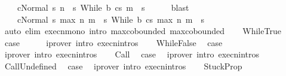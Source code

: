 \begin{isabellebody}
\ \ \ \ {\isachardoublequoteopen}{\isasymGamma}{\isasymturnstile}{\isasymlangle}c{\isacharcomma}Normal\ s{\isasymrangle}\ {\isacharequal}n{\isasymRightarrow}\ \ s{\isacharprime}{\isachardoublequoteclose}\ {\isachardoublequoteopen}{\isasymGamma}{\isasymturnstile}{\isasymlangle}While\ b\ c{\isacharcomma}s{\isacharprime}{\isasymrangle}\ {\isacharequal}m{\isasymRightarrow}\ \ s{\isacharprime}{\isacharprime}{\isachardoublequoteclose}\isanewline
\ \ \ \ \isamarkupfalse%
\ blast\isanewline
\ \ \isamarkupfalse%
\ \isamarkupfalse%
\ \isanewline
\ \ \ \ {\isachardoublequoteopen}{\isasymGamma}{\isasymturnstile}{\isasymlangle}c{\isacharcomma}Normal\ s{\isasymrangle}\ {\isacharequal}max\ n\ m{\isasymRightarrow}\ \ s{\isacharprime}{\isachardoublequoteclose}\ {\isachardoublequoteopen}{\isasymGamma}{\isasymturnstile}{\isasymlangle}While\ b\ c{\isacharcomma}s{\isacharprime}{\isasymrangle}\ {\isacharequal}max\ n\ m{\isasymRightarrow}\ \ s{\isacharprime}{\isacharprime}{\isachardoublequoteclose}\isanewline
\ \ \ \ \isamarkupfalse%
\ {\isacharparenleft}auto\ elim{\isacharbang}{\isacharcolon}\ execn{\isacharunderscore}mono\ intro{\isacharcolon}\ max{\isachardot}cobounded{}\ max{\isachardot}cobounded{}{\isacharparenright}\isanewline
\ \ \isamarkupfalse%
\ WhileTrue\isanewline
\ \ \isamarkupfalse%
\ {\isacharquery}case\isanewline
\ \ \ \ \isamarkupfalse%
\ {\isacharparenleft}iprover\ intro{\isacharcolon}\ execn{\isachardot}intros{\isacharparenright}\isanewline
{}\isamarkupfalse%
\isanewline
\ \ \isamarkupfalse%
\ WhileFalse\ \isamarkupfalse%
\ {\isacharquery}case\ \isamarkupfalse%
\ {\isacharparenleft}iprover\ intro{\isacharcolon}\ execn{\isachardot}intros{\isacharparenright}\isanewline
{}\isamarkupfalse%
\isanewline
\ \ \isamarkupfalse%
\ Call\ \isamarkupfalse%
\ {\isacharquery}case\ \isamarkupfalse%
\ {\isacharparenleft}iprover\ intro{\isacharcolon}\ execn{\isachardot}intros{\isacharparenright}\isanewline
{}\isamarkupfalse%
\isanewline
\ \ \isamarkupfalse%
\ CallUndefined\ \isamarkupfalse%
\ {\isacharquery}case\ \isamarkupfalse%
\ {\isacharparenleft}iprover\ intro{\isacharcolon}\ execn{\isachardot}intros{\isacharparenright}\isanewline
{}\isamarkupfalse%
\isanewline
\ \ \isamarkupfalse%
\ StuckProp\ \isamarkupfalse%

\end{isabellebody}
